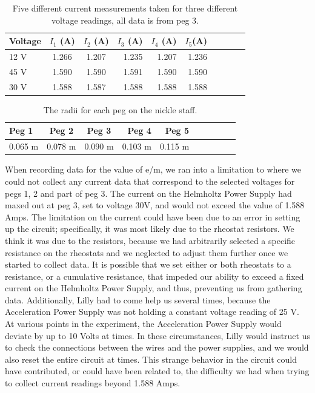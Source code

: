 \documentclass[twoside,10pt]{article}
\begin{document}
\begin{multicols}{2}
		\begin{table}[H]
		\centering
		\small
		\caption{Five different current measurements taken for three different voltage readings, all data is from peg 3.}
		\begin{tabular}{l c c rrrrrrr}
			\toprule				
			Voltage &  $I_1$ (A) & $I_2$ (A) & $I_3$ (A) & $I_4$ (A) & $I_5$(A) \\ [1ex]
			\midrule
			12 V	 & 1.266 & 1.207 & 1.235 & 1.207 & 1.236 \\ [1.5ex]
			45 V	& 1.590 & 1.590 & 1.591 & 1.590 & 1.590  \\ [1.5ex]
			30 V	& 1.588 & 1.587 & 1.588 & 1.588 & 1.588  \\ [1.5ex]
		
			\bottomrule
		\end{tabular}
	\end{table}

			\begin{table}[H]
			\centering
			\small
			\caption{The radii for each peg on the nickle staff.}
			\begin{tabular}{l c c rrrrrrr}
				\toprule				
				Peg 1  &  Peg 2  & Peg 3  & Peg 4  & Peg 5 \\ [1ex]
				\midrule
				0.065 m 	 & 0.078 m & 0.090 m & 0.103 m & 0.115 m  \\ [1.5ex]
				
				\bottomrule
			\end{tabular}
		\end{table}
		
		When recording data for the value of e/m, we ran into a limitation to where we could not collect any current data that correspond to the selected voltages for pegs 1, 2 and part of peg 3. The current on the Helmholtz Power Supply had maxed out at peg 3, set to voltage 30V, and would not exceed the value of 1.588 Amps. The limitation on the current could have been due to an error in setting up the circuit; specifically, it was most likely due to the rheostat resistors. We think it was due to the resistors, because we had arbitrarily selected a specific resistance on the rheostats and we neglected to adjust them further once we started to collect data. It is possible that we set either or both rheostats to a resistance, or a cumulative resistance, that impeded our ability to exceed a fixed current on the Helmholtz Power Supply, and thus, preventing us from gathering data. Additionally, Lilly had to come help us several times, because the Acceleration Power Supply was not holding a constant voltage reading of 25 V. At various points in the experiment, the Acceleration Power Supply would deviate by up to 10 Volts at times. In these circumstances, Lilly would instruct us to check the connections between the wires and the power supplies, and we would also reset the entire circuit at times. This strange behavior in the circuit could have contributed, or could have been related to, the difficulty we had when trying to collect current readings beyond 1.588 Amps. 
		

\end{multicols}
\end{document}
